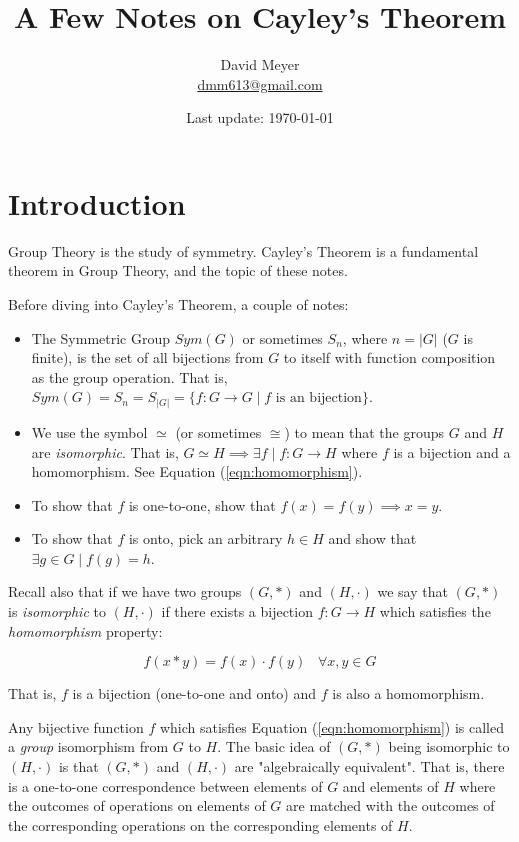 \documentclass{article}
\title{A Few Notes on Cayley’s Theorem}
\author{David Meyer \\ \href{mailto:dmm613@gmail.com}
                            {dmm613@gmail.com}}
\date{Last update: \today}
\theoremstyle{definition}
\begin{document}
\maketitle
%
%
%
\section{Introduction}
Group Theory is the study of symmetry.  Cayley's Theorem is a
fundamental theorem in Group Theory, and the topic of these
notes.

\bigskip
\noindent
Before diving into Cayley's Theorem, a couple of notes:
\begin{itemize}
  \item The Symmetric Group $Sym(G)$ or sometimes $S_n$, where $n
  = |G|$ ($G$ is finite), is the set of all bijections from $G$
  to itself with function composition as the group operation.
  That is, $Sym(G) = S_n = S_{|G|} = \{f: G \rightarrow G \mid f
  \text{ is an bijection}\}$.
  \item We use the symbol $\simeq$ (or sometimes $\cong$) to mean
  that the groups $G$ and $H$ are \emph{isomorphic}. That is, $G
  \simeq H \implies \exists f \mid f: G \rightarrow H$ where $f$
  is a bijection and a homomorphism. See Equation (\ref{eqn:homomorphism}).
  \item To show that $f$ is one-to-one, show that $f(x) = f(y)
  \implies x = y$.
  \item To show that $f$ is onto, pick an arbitrary $h \in H$ and
  show that $\exists g \in G \mid f(g) = h$. 
\end{itemize}

\bigskip
\noindent
Recall also that if we have two groups $(G,*)$ and $(H,\cdot)$ we
say that $(G,*)$ is \emph{isomorphic} to $(H,\cdot)$ if there
exists a bijection $f:G \rightarrow H$ which satisfies the
\emph{homomorphism} property:

\bigskip
\begin{equation}
f(x * y) = f(x) \cdot f(y) \;\;\; \forall  x,y \in G
\label{eqn:homomorphism}
\end{equation}

\bigskip
\noindent
That is, $f$ is a bijection (one-to-one and onto) and $f$ is also
a homomorphism. 


\bigskip
\noindent
Any bijective function $f$ which satisfies Equation
(\ref{eqn:homomorphism}) is called a \emph{group} isomorphism from
$G$ to $H$. The basic idea of $(G,*)$ being isomorphic to
$(H,\cdot)$ is that $(G,*)$ and $(H,\cdot)$ are "algebraically
equivalent". That is, there is a one-to-one correspondence
between elements of $G$ and elements of $H$ where the outcomes of
operations on elements of $G$ are matched with the outcomes of
the corresponding operations on the corresponding elements of
$H$.
\end{document}

